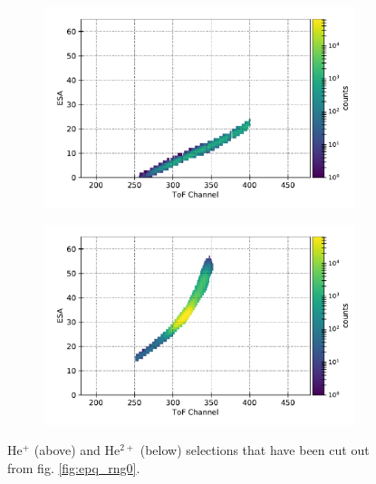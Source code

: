 \begin{figure}
	\centering
\begin{subfigure}{.9\linewidth}
	\centering
	\includegraphics[width=1\linewidth]{Figures/epq_He1.pdf}
	\centering
\end{subfigure}
\begin{subfigure}{.9\linewidth}
	\centering
	\includegraphics[width=1\linewidth]{Figures/epq_He2.pdf}
	\centering
\end{subfigure}
	\caption{$\mathrm{He^{+}}$ (above) and $\mathrm{He^{2+}}$ (below) selections that have been cut out from fig. \ref{fig:epq_rng0}.}
\label{fig:cutouts}
\end{figure}